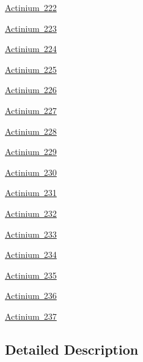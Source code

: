 \begin{DoxyCompactItemize}
\mbox{\hyperlink{group___isotope_const-_actinium-_ac222}{Actinium 222}}
\item 
\mbox{\hyperlink{group___isotope_const-_actinium-_ac223}{Actinium 223}}
\item 
\mbox{\hyperlink{group___isotope_const-_actinium-_ac224}{Actinium 224}}
\item 
\mbox{\hyperlink{group___isotope_const-_actinium-_ac225}{Actinium 225}}
\item 
\mbox{\hyperlink{group___isotope_const-_actinium-_ac226}{Actinium 226}}
\item 
\mbox{\hyperlink{group___isotope_const-_actinium-_ac227}{Actinium 227}}
\item 
\mbox{\hyperlink{group___isotope_const-_actinium-_ac228}{Actinium 228}}
\item 
\mbox{\hyperlink{group___isotope_const-_actinium-_ac229}{Actinium 229}}
\item 
\mbox{\hyperlink{group___isotope_const-_actinium-_ac230}{Actinium 230}}
\item 
\mbox{\hyperlink{group___isotope_const-_actinium-_ac231}{Actinium 231}}
\item 
\mbox{\hyperlink{group___isotope_const-_actinium-_ac232}{Actinium 232}}
\item 
\mbox{\hyperlink{group___isotope_const-_actinium-_ac233}{Actinium 233}}
\item 
\mbox{\hyperlink{group___isotope_const-_actinium-_ac234}{Actinium 234}}
\item 
\mbox{\hyperlink{group___isotope_const-_actinium-_ac235}{Actinium 235}}
\item 
\mbox{\hyperlink{group___isotope_const-_actinium-_ac236}{Actinium 236}}
\item 
\mbox{\hyperlink{group___isotope_const-_actinium-_ac237}{Actinium 237}}
\end{DoxyCompactItemize}


\subsection{Detailed Description}
